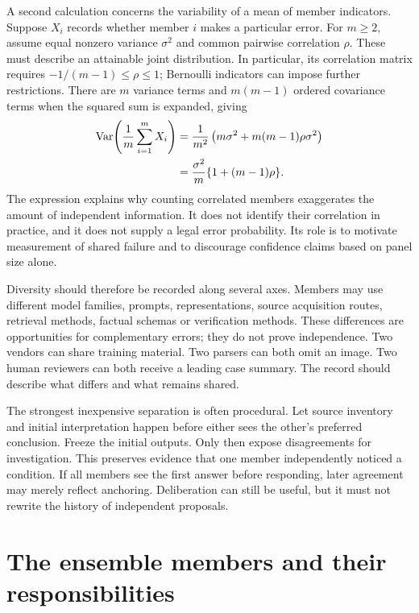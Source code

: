 
A second calculation concerns the variability of a mean of member indicators.
Suppose $X_i$ records whether member $i$ makes a particular error. For
$m\geq2$, assume equal nonzero variance $\sigma^2$ and common pairwise
correlation $\rho$. These must describe an attainable joint distribution.
In particular, its correlation matrix requires
$-1/(m-1)\leq\rho\leq1$; Bernoulli indicators can impose further
restrictions. There are $m$ variance terms and $m(m-1)$ ordered covariance
terms when the squared sum is expanded, giving
\begin{align}
 \operatorname{Var}\!\left(\frac1m\sum_{i=1}^m X_i\right)
 &=\frac{1}{m^2}\left(m\sigma^2+m(m-1)\rho\sigma^2\right)\notag\\
 &=\frac{\sigma^2}{m}\{1+(m-1)\rho\}.
 \label{eq:ensemble-variance}
\end{align}
The expression explains why counting correlated members exaggerates the amount
of independent information. It does not identify their correlation in practice,
and it does not supply a legal error probability. Its role is to motivate
measurement of shared failure and to discourage confidence claims based on panel
size alone.

Diversity should therefore be recorded along several axes. Members may use
different model families, prompts, representations, source acquisition routes,
retrieval methods, factual schemas or verification methods. These differences are
opportunities for complementary errors; they do not prove independence. Two
vendors can share training material. Two parsers can both omit an image. Two human
reviewers can both receive a leading case summary. The record should describe
what differs and what remains shared.

The strongest inexpensive separation is often procedural. Let source inventory
and initial interpretation happen before either sees the other's preferred
conclusion. Freeze the initial outputs. Only then expose disagreements for
investigation. This preserves evidence that one member independently noticed a
condition. If all members see the first answer before responding, later agreement
may merely reflect anchoring. Deliberation can still be useful, but it must not
rewrite the history of independent proposals.

\section{The ensemble members and their responsibilities}
\label{merge:M06:02}


